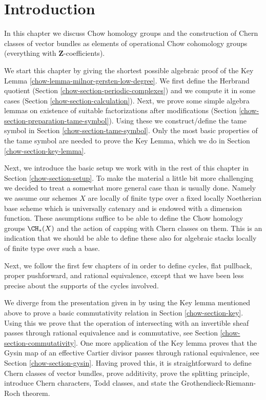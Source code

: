 \section{Introduction}
\label{chow-section-introduction}
In this chapter we discuss Chow homology groups and the construction
of Chern classes of vector bundles as elements of operational
Chow cohomology groups (everything with $\mathbf{Z}$-coefficients).

\medskip\noindent
We start this chapter by giving the shortest possible
algebraic proof of the Key Lemma \ref{chow-lemma-milnor-gersten-low-degree}.
We first define the Herbrand quotient
(Section \ref{chow-section-periodic-complexes})
and we compute it in some cases
(Section \ref{chow-section-calculation}).
Next, we prove some simple algebra lemmas on
existence of suitable factorizations after modifications
(Section \ref{chow-section-preparation-tame-symbol}).
Using these we construct/define the tame symbol in
Section \ref{chow-section-tame-symbol}.
Only the most basic properties of the tame symbol
are needed to prove the Key Lemma, which we do
in Section \ref{chow-section-key-lemma}.

\medskip\noindent
Next, we introduce the basic setup we work with in the rest of this
chapter in Section \ref{chow-section-setup}. To make the material a little
bit more challenging we decided to treat a somewhat more general case
than is usually done. Namely we assume our schemes $X$ are locally of
finite type over a fixed locally Noetherian base scheme which is universally
catenary and is endowed with a dimension function. These assumptions suffice
to be able to define the Chow homology groups $\CH_*(X)$ and the action of
capping with Chern classes on them. This is an indication that we should
be able to define these also for algebraic stacks locally of finite type
over such a base.

\medskip\noindent
Next, we follow the first few chapters of \cite{F} in order to define
cycles, flat pullback, proper pushforward, and rational equivalence,
except that we have been less precise about the supports of the cycles
involved.

\medskip\noindent
We diverge from the presentation given in \cite{F} by using the
Key lemma mentioned above to prove a basic commutativity relation in
Section \ref{chow-section-key}. Using this we prove that the operation
of intersecting with an invertible sheaf passes through rational
equivalence and is commutative, see Section \ref{chow-section-commutativity}.
One more application of the Key
lemma proves that the Gysin map of an effective Cartier divisor
passes through rational equivalence, see Section \ref{chow-section-gysin}.
Having proved this, it is straightforward to define Chern
classes of vector bundles, prove additivity, prove the splitting principle,
introduce Chern characters, Todd classes, and state the
Grothendieck-Riemann-Roch theorem.

